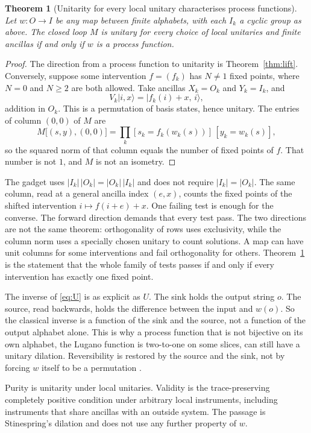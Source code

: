 \documentclass[11pt]{article}
\newtheorem{theorem}{Theorem}
\theoremstyle{definition}
\theoremstyle{remark}
\newcommand{\ket}[1]{\lvert #1\rangle}
\begin{document}
\begin{theorem}[Unitarity for every local unitary characterises process functions]
\label{thm:iff}
Let \(w:O\to I\) be any map between finite alphabets, with each \(I_k\) a cyclic group as above. The closed loop \(M\) is unitary for every choice of local unitaries and finite ancillas if and only if \(w\) is a process function.
\end{theorem}

\begin{proof}
The direction from a process function to unitarity is Theorem~\ref{thm:lift}. Conversely, suppose some intervention \(f=(f_k)\) has \(N\neq 1\) fixed points, where \(N=0\) and \(N\ge 2\) are both allowed. Take ancillas \(X_k=O_k\) and \(Y_k=I_k\), and
\[
V_k\ket{i,x}=\ket{f_k(i)+x,\,i},
\]
addition in \(O_k\). This is a permutation of basis states, hence unitary. The entries of column \((0,0)\) of \(M\) are
\[
M\bigl[(s,y),(0,0)\bigr]
=\prod_k [s_k=f_k(w_k(s))]\,[y_k=w_k(s)],
\]
so the squared norm of that column equals the number of fixed points of \(f\). That number is not \(1\), and \(M\) is not an isometry.
\end{proof}

The gadget uses \(|I_k|\,|O_k|=|O_k|\,|I_k|\) and does not require \(|I_k|=|O_k|\). The same column, read at a general ancilla index \((e,x)\), counts the fixed points of the shifted intervention \(i\mapsto f(i+e)+x\). One failing test is enough for the converse. The forward direction demands that every test pass. The two directions are not the same theorem: orthogonality of rows uses exclusivity, while the column norm uses a specially chosen unitary to count solutions. A map can have unit columns for some interventions and fail orthogonality for others. Theorem~\ref{thm:iff} is the statement that the whole family of tests passes if and only if every intervention has exactly one fixed point.

The inverse of \eqref{eq:U} is as explicit as \(U\). The sink holds the output string \(o\). The source, read backwards, holds the difference between the input and \(w(o)\). So the classical inverse is a function of the sink and the source, not a function of the output alphabet alone. This is why a process function that is not bijective on its own alphabet, the Lugano function is two-to-one on some slices, can still have a unitary dilation. Reversibility is restored by the source and the sink, not by forcing \(w\) itself to be a permutation \cite{baumeler2019}.

Purity is unitarity under local unitaries. Validity is the trace-preserving completely positive condition under arbitrary local instruments, including instruments that share ancillas with an outside system. The passage is Stinespring's dilation and does not use any further property of \(w\).
\end{document}
